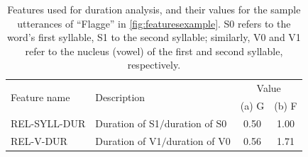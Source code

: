 \begin{table}[b]%
		\centering
		\caption[Features used for duration analysis]{Features used for duration analysis, and their values for the sample utterances of ``Flagge'' in \cref{fig:featuresexample}. 
		S0 refers to the word's first syllable, S1 to the second syllable; similarly, V0 and V1 refer to the nucleus (vowel) of the first and second syllable, respectively.
		}
		
%
%		
		\begin{tabularx}{\textwidth}{lXcc}
		\toprule
		\multirow{2}{*}{Feature name} 
									& \multirow{2}{*}{Description}
														& \multicolumn{2}{c}{Value} \\
	&												&  (a) G		& (b) F \\
		\midrule
		REL-SYLL-DUR 	
			& Duration of S1$/$duration of S0
			& 	0.50		& 	1.00	\\
		REL-V-DUR 		
			& Duration of V1$/$duration of V0
			& 	0.56		& 	1.71	\\
		\bottomrule	
		\end{tabularx}
		\label{tab:durationfeatures}
\end{table}



